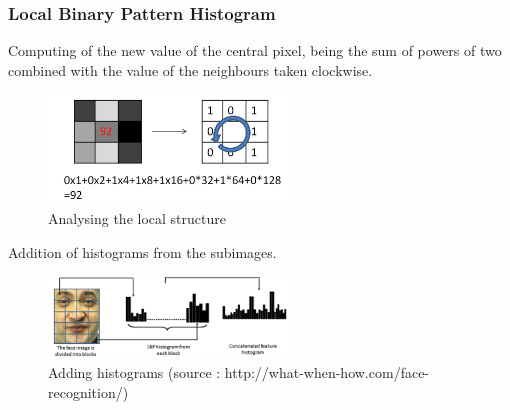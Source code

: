\subsubsection{Local Binary Pattern Histogram}

Computing of the new value of the central pixel, being the sum of powers of two combined with the value of the neighbours taken clockwise.
\begin{figure}[ht]
\centering
\includegraphics[width=2.5in]{rsrc/LBPH1.jpg}
\caption{Analysing the local structure}
\label{Local Structure}
\end{figure}

Addition of histograms from the subimages.

\begin{figure}[ht]
\centering
\includegraphics[width=2.5in]{rsrc/LBPH2.png}
\caption{Adding histograms (source : http://what-when-how.com/face-recognition/)}
\label{Adding histograms}
\end{figure}



